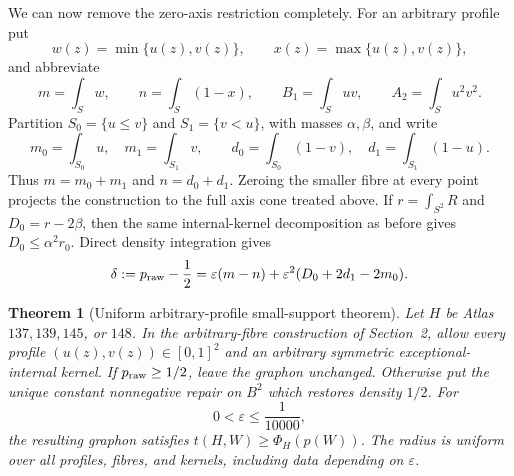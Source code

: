 \documentclass[11pt]{article}
\newtheorem{theorem}{Theorem}[section]
\begin{document}
We can now remove the zero-axis restriction completely.  For an arbitrary
profile put
\[
 w(z)=\min\{u(z),v(z)\},\qquad x(z)=\max\{u(z),v(z)\},
\]
and abbreviate
\[
 m=\int_Sw,\qquad n=\int_S(1-x),\qquad
 B_1=\int_Suv,\qquad A_2=\int_Su^2v^2.
\]
Partition $S_0=\{u\leq v\}$ and $S_1=\{v<u\}$, with masses
$\alpha,\beta$, and write
\[
 m_0=\int_{S_0}u,\quad m_1=\int_{S_1}v,\qquad
 d_0=\int_{S_0}(1-v),\quad d_1=\int_{S_1}(1-u).
\]
Thus $m=m_0+m_1$ and $n=d_0+d_1$.  Zeroing the smaller fibre at every
point projects the construction to the full axis cone treated above.  If
$r=\int_{S^2}R$ and $D_0=r-2\beta$, then the same internal-kernel
decomposition as before gives $D_0\leq\alpha^2r_0$.  Direct density
integration gives
\begin{equation}
 \delta:=p_{\rm raw}-\frac12
 =\varepsilon(m-n)
  +\varepsilon^2(D_0+2d_1-2m_0).
 \label{eq:full-profile-density}
\end{equation}

\begin{theorem}[Uniform arbitrary-profile small-support theorem]
\label{thm:full-profile-uniform}
Let $H$ be Atlas $137,139,145$, or $148$.  In the arbitrary-fibre
construction of Section~2, allow every profile $(u(z),v(z))\in[0,1]^2$ and
an arbitrary symmetric exceptional-internal kernel.  If
$p_{\rm raw}\geq1/2$, leave the graphon unchanged.  Otherwise put the unique
constant nonnegative repair on $B^2$ which restores density $1/2$.  For
\[
 0<\varepsilon\leq\frac1{10000},
\]
the resulting graphon satisfies $t(H,W)\geq\Phi_H(p(W))$.  The radius is
uniform over all profiles, fibres, and kernels, including data depending on
$\varepsilon$.
\end{theorem}
\end{document}
